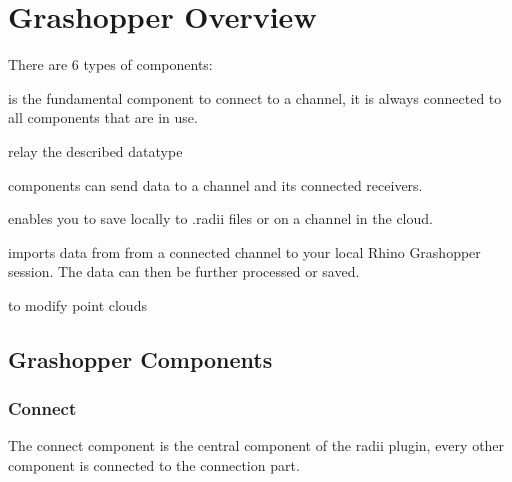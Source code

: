\documentclass[letterpaper,10pt,english]{sphinxmanual}
\begin{document}
\sphinxstepscope


\section{Grashopper Overview}
\label{\detokenize{tutorial/grashopper/documentation_rst/01_Components_Overview:grashopper-overview}}\label{\detokenize{tutorial/grashopper/documentation_rst/01_Components_Overview::doc}}
\noindent{}

\sphinxAtStartPar
There are 6 types of components:

\begin{DUlineblock}{0em}
\item[]  is the fundamental component to connect to a channel, it is always connected to all components that are in use.
\item[]  relay the described datatype
\item[]  components can send data to a channel and its connected receivers.
\item[]  enables you to save locally to .radii files or on a channel in the cloud.
\item[]  imports data from from a connected channel to your local Rhino Grashopper session. The data can then be further processed or saved.
\item[]  to modify point clouds
\end{DUlineblock}


\subsection{Grashopper Components}
\label{\detokenize{tutorial/grashopper/documentation_rst/01_Components_Overview:grashopper-components}}
\sphinxAtStartPar
{}

\sphinxstepscope


\subsubsection{Connect}
\label{\detokenize{tutorial/grashopper/documentation_rst/02_connect:connect}}\label{\detokenize{tutorial/grashopper/documentation_rst/02_connect::doc}}
\sphinxAtStartPar
The connect component is the central component of the radii plugin, every other component is connected to the connection part.
\end{document}
